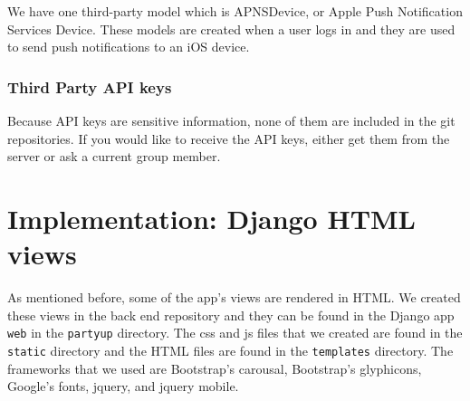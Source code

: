 \documentclass[12pt]{article}
\begin{document}
We have one third-party model which is APNSDevice, or Apple Push Notification Services Device. 
These models are created when a user logs in and they are used to send push notifications to an iOS device.

\subsubsection{Third Party API keys}

Because API keys are sensitive information, none of them are included in the git repositories. 
If you would like to receive the API keys, either get them from the server or ask a current group member.

\section{Implementation: Django HTML views}

As mentioned before, some of the app's views are rendered in HTML. We created these views in the back end repository and they can be found in the Django app \texttt{web} in the \texttt{partyup} directory. The css and js files that we created are found in the  \texttt{static} directory and the HTML files are found in the  \texttt{templates} directory. The frameworks that we used are Bootstrap's carousal, Bootstrap's glyphicons, Google's fonts, jquery, and jquery mobile. 
\end{document}
